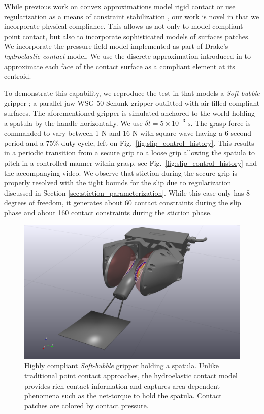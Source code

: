 While previous work on convex approximations model rigid contact
\cite{bib:anitescu2006,bib:mazhar2014} or use regularization as a means of
constraint stabilization \cite{bib:todorov2014}, our work is novel in that we
incorporate physical compliance. This allows us not only to model compliant
point contact, but also to incorporate sophisticated models of surfaces patches.
We incorporate the pressure field model \cite{bib:elandt2019pressure}
implemented as part of Drake's \cite{bib:drake} \emph{hydroelastic contact}
model. We use the discrete approximation introduced in
\cite{bib:masterjohn2021discrete} to approximate each face of the contact
surface as a compliant element at its centroid.

To demonstrate this capability, we reproduce the test in
\cite{bib:masterjohn2021discrete} that models a \emph{Soft-bubble} gripper
\cite{bib:kuppuswamy2020soft}; a parallel jaw WSG 50 Schunk gripper outfitted
with air filled compliant surfaces. The aforementioned gripper is simulated
anchored to the world holding a spatula by the handle horizontally. We use
$\delta t=5\times 10^{-3}\text{ s}$. The grasp force is commanded to vary
between 1 N and 16 N with square wave having a 6 second period and a 75\% duty
cycle, left on Fig.~\ref{fig:slip_control_history}. This results in a periodic
transition from a secure grip to a loose grip allowing the spatula to pitch in a
controlled manner within grasp, see Fig.~\ref{fig:slip_control_history} and the
accompanying video. We observe that stiction during the secure grip is properly
resolved with the tight bounds for the slip due to regularization discussed in
Section \ref{sec:stiction_parameterization}. While this case only has 8 degrees
of freedom, it generates about 60 contact constraints during the slip phase and
about 160 contact constraints during the stiction phase.

\begin{figure}[!h]
	\centering
	\includegraphics[width=0.8\columnwidth]{figures/slip_control/slip_control_single_frame.png}
	\caption{\label{fig:slip_control_frame} 
	Highly compliant \emph{Soft-bubble} gripper \cite{bib:kuppuswamy2020soft}
	holding a spatula. Unlike traditional point contact approaches, the
	hydroelastic contact model provides rich contact information and captures
	area-dependent phenomena such as the net-torque to hold the spatula. Contact
	patches are colored by contact pressure.}
\end{figure}


